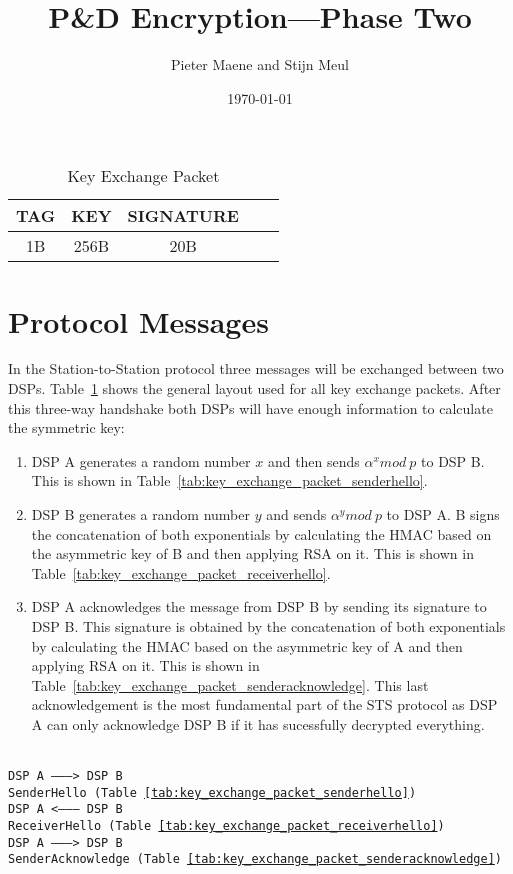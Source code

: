 \documentclass[a4paper]{article}
\title{P\&D Encryption---Phase Two}
\author{Pieter Maene and Stijn Meul}
\date{\today}
\begin{document}
\maketitle

\begin{table}[H]
    \begin{center}
        \begin{tabular}{| c | c | c | c | c |}
            \hline
            TAG & KEY & SIGNATURE \\ \hline
            1B & 256B & 20B \\
            \hline
        \end{tabular}
    \end{center}
    
    \caption{Key Exchange Packet}
    \label{tab:key_exchange_packet}
\end{table}

\section{Protocol Messages}
In the Station-to-Station protocol three messages will be exchanged between two DSPs. Table~\ref{tab:key_exchange_packet} shows the general layout used for all key exchange packets. After this three-way handshake both DSPs will have enough information to calculate the symmetric key:

\begin{enumerate}
 \item DSP A generates a random number $x$ and then sends $\alpha^x mod\ p$ to DSP B. This is shown in Table~\ref{tab:key_exchange_packet_senderhello}.
 \item DSP B generates a random number $y$ and sends $\alpha^y mod\ p$ to DSP A. B signs the concatenation of both exponentials by calculating the HMAC based on the asymmetric key of B and then applying RSA on it. This is shown in Table~\ref{tab:key_exchange_packet_receiverhello}.
 \item DSP A acknowledges the message from DSP B by sending its signature to DSP B. This signature is obtained by the concatenation of both exponentials by calculating the HMAC based on the asymmetric key of A and then applying RSA on it.  This is shown in Table~\ref{tab:key_exchange_packet_senderacknowledge}. This last acknowledgement is the most fundamental part of the STS protocol as DSP A can only acknowledge DSP B if it has sucessfully decrypted everything.
\end{enumerate}
\begin{center}
  \texttt{ \\
  DSP A ---------> DSP B\\
  SenderHello (Table~\ref{tab:key_exchange_packet_senderhello})\\
  DSP A <--------- DSP B\\
  ReceiverHello (Table~\ref{tab:key_exchange_packet_receiverhello})\\
  DSP A ---------> DSP B\\
  SenderAcknowledge (Table~\ref{tab:key_exchange_packet_senderacknowledge})\\
  }
\end{center}
\end{document}

